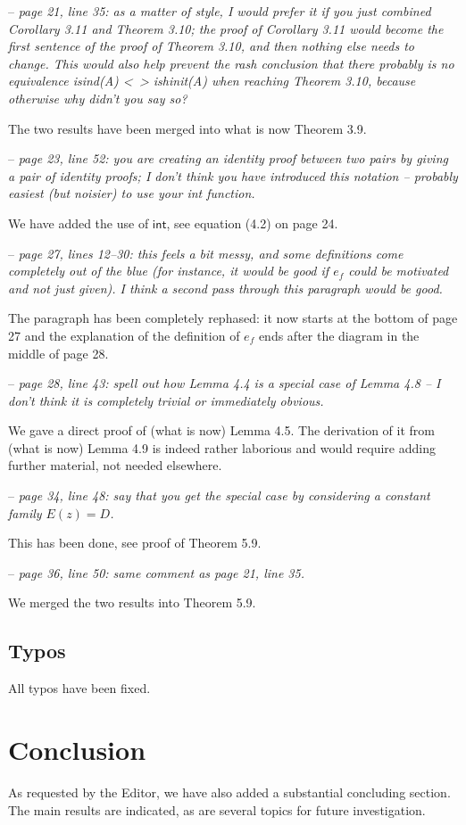 \documentclass[10pt,a4paper,oneside,reqno]{amsart}
\numberwithin{equation}{section}
\theoremstyle{mythm}
\theoremstyle{mydef}
\theoremstyle{myrmk}
\begin{document}
-- \emph{page 21, line 35: as a matter of style, I would prefer it if you just combined Corollary 3.11 and Theorem 3.10; the proof of Corollary 3.11 would become the first sentence of the proof of Theorem 3.10, and then nothing else needs to change. This would also help prevent the rash conclusion that there probably is no
 equivalence isind(A) <~> ishinit(A) when reaching Theorem 3.10, because otherwise why didn't you say so?}  

The two results have been merged into what is now Theorem 3.9. 

-- \emph{page 23, line 52: you are creating an identity proof between two pairs by giving a pair of identity proofs; I don't think you have introduced this notation -- probably easiest (but noisier) to use your int function.} 

We have added the use of $\mathsf{int}$, see equation (4.2) on page 24. 

-- \emph{page 27, lines 12--30: this feels a bit messy, and some definitions come completely out of the blue (for instance, it would be good if $e_f$ could be motivated and not just given). I think a second pass through this paragraph would be good.} 

The paragraph has been completely rephased: it now starts at the bottom of page 27 and the explanation of the definition of $e_f$ ends after the diagram in the middle of page 28.

-- \emph{page 28, line 43: spell out how Lemma 4.4 is a special case of Lemma 4.8 -- I don't think it is completely trivial or immediately obvious.} 

We gave a direct proof of (what is now) Lemma 4.5. The derivation of it from (what is now) Lemma 4.9 is indeed rather laborious and would require adding further material, not needed elsewhere. 

-- \emph{page 34, line 48: say that you get the special case by considering a constant family $E(z) = D$.} 

This has been done, see proof of Theorem 5.9. 

-- \emph{page 36, line 50: same comment as page 21, line 35.} 

We merged the two results into Theorem 5.9.




\subsection*{Typos} \hfill 

All typos have been fixed. 

\section{Conclusion}

As requested by the Editor, we have also added a substantial concluding section. The main results are indicated, as are several topics for future investigation.
\end{document}
